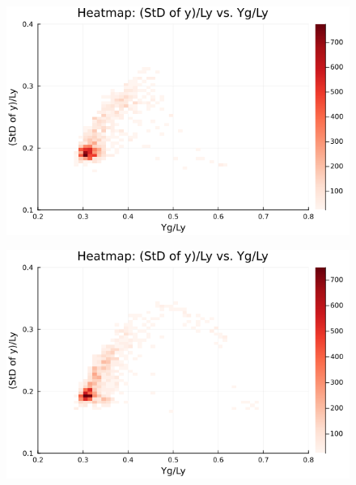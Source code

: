 \begin{figure}[H]
  \centering
  \includegraphics[scale=0.6]{image/RaRtmap_heat/2023-11-15T01:35:17.404__chi1.265_Ay50_rho0.4_T0.43_dT0.04_Rd0.0_Rt0.125_Ra1.4081535_g0.0003999718779659611_run4.0e7_output.png}
  \label{}
\end{figure}

\begin{figure}[H]
  \centering
  \includegraphics[scale=0.6]{image/RaRtmap_heat/2023-11-15T02:27:34.337__chi1.265_Ay50_rho0.4_T0.43_dT0.04_Rd0.0_Rt0.125_Ra1.877538_g0.0003999718779659611_run4.0e7_output.png}
  \label{}
\end{figure}

